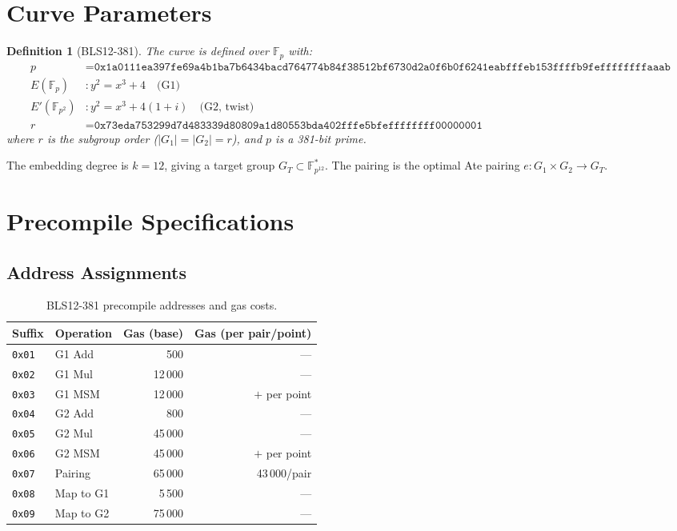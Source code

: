 \documentclass[11pt,a4paper]{article}
\newtheorem{definition}{Definition}
\begin{document}
\section{Curve Parameters}

\begin{definition}[BLS12-381]
The curve is defined over $\mathbb{F}_p$ with:
\begin{align}
  p &= \texttt{0x1a0111ea397fe69a4b1ba7b6434bacd764774b84f38512bf6730d2a0f6b0f6241eabfffeb153ffffb9feffffffffaaab} \\
  E(\mathbb{F}_p) &: y^2 = x^3 + 4 \quad \text{(G1)} \\
  E'(\mathbb{F}_{p^2}) &: y^2 = x^3 + 4(1+i) \quad \text{(G2, twist)} \\
  r &= \texttt{0x73eda753299d7d483339d80809a1d80553bda402fffe5bfeffffffff00000001}
\end{align}
where $r$ is the subgroup order ($|G_1| = |G_2| = r$), and $p$ is a 381-bit prime.
\end{definition}

The embedding degree is $k = 12$, giving a target group $G_T \subset \mathbb{F}_{p^{12}}^*$.
The pairing is the optimal Ate pairing $e : G_1 \times G_2 \to G_T$.

\section{Precompile Specifications}

\subsection{Address Assignments}

\begin{table}[H]
\centering
\caption{BLS12-381 precompile addresses and gas costs.}
\label{tab:bls-addresses}
\begin{tabular}{llrr}
\toprule
\textbf{Suffix} & \textbf{Operation} & \textbf{Gas (base)} & \textbf{Gas (per pair/point)} \\
\midrule
\texttt{0x01} & G1 Add     & 500   & --- \\
\texttt{0x02} & G1 Mul     & 12\,000 & --- \\
\texttt{0x03} & G1 MSM     & 12\,000 & $+$ per point \\
\texttt{0x04} & G2 Add     & 800   & --- \\
\texttt{0x05} & G2 Mul     & 45\,000 & --- \\
\texttt{0x06} & G2 MSM     & 45\,000 & $+$ per point \\
\texttt{0x07} & Pairing    & 65\,000 & 43\,000/pair \\
\texttt{0x08} & Map to G1  & 5\,500  & --- \\
\texttt{0x09} & Map to G2  & 75\,000 & --- \\
\bottomrule
\end{tabular}
\end{table}
\end{document}
